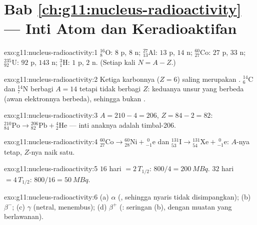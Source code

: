 \section*{Bab \ref{ch:g11:nucleus-radioactivity} --- Inti Atom dan Keradioaktifan}

\begin{solution}{exo:g11:nucleus-radioactivity:1}
${}^{16}_{8}\mathrm{O}$: $8$ p, $8$ n; ${}^{27}_{13}\mathrm{Al}$: $13$ p,
$14$ n; ${}^{60}_{27}\mathrm{Co}$: $27$ p, $33$ n;
${}^{235}_{92}\mathrm{U}$: $92$ p, $143$ n; ${}^{3}_{1}\mathrm{H}$: $1$ p,
$2$ n. (Setiap kali $N = A - Z$.)
\end{solution}

\begin{solution}{exo:g11:nucleus-radioactivity:2}
Ketiga karbonnya ($Z = 6$) saling merupakan .
${}^{14}_{6}\mathrm{C}$ dan ${}^{14}_{7}\mathrm{N}$ berbagi $A = 14$ tetapi
tidak berbagi $Z$: keduanya unsur yang berbeda (awan elektronnya berbeda),
sehingga bukan .
\end{solution}

\begin{solution}{exo:g11:nucleus-radioactivity:3}
$A = 210 - 4 = 206$, $Z = 84 - 2 = 82$:
${}^{210}_{84}\mathrm{Po} \to {}^{206}_{82}\mathrm{Pb} +
{}^{4}_{2}\mathrm{He}$ --- inti anaknya adalah timbal-206.
\end{solution}

\begin{solution}{exo:g11:nucleus-radioactivity:4}
${}^{60}_{27}\mathrm{Co} \to {}^{60}_{28}\mathrm{Ni} +
{}^{\;0}_{-1}\mathrm{e}$ dan
${}^{131}_{53}\mathrm{I} \to {}^{131}_{54}\mathrm{Xe} +
{}^{\;0}_{-1}\mathrm{e}$: $A$-nya tetap, $Z$-nya naik satu.
\end{solution}

\begin{solution}{exo:g11:nucleus-radioactivity:5}
$16$ hari $= 2\,T_{1/2}$: $800/4 = \qty{200}{MBq}$. $32$ hari
$= 4\,T_{1/2}$: $800/16 = \qty{50}{MBq}$.
\end{solution}

\begin{solution}{exo:g11:nucleus-radioactivity:6}
(a) $\alpha$ (, sehingga nyaris tidak disimpangkan); (b) $\beta^-$;
(c) $\gamma$ (netral, menembus); (d) $\beta^+$ (: seringan (b),
dengan muatan yang berlawanan).
\end{solution}

